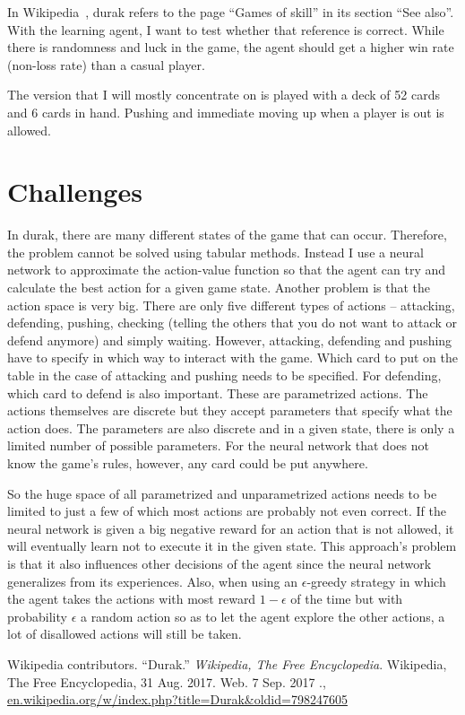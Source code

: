 \documentclass[a4paper,titlepage]{article}
\begin{document}
In Wikipedia~\cite{wikidurak}, durak refers to the page ``Games of skill'' in its section ``See also''. With the learning agent, I want to test whether that reference is correct. While there is randomness and luck in the game, the agent should get a higher win rate (non-loss rate) than a casual player. \medskip

The version that I will mostly concentrate on is played with a deck of 52 cards and 6 cards in hand. Pushing and immediate moving up when a player is out is allowed.

\section{Challenges}

In durak, there are many different states of the game that can occur. Therefore, the problem cannot be solved using tabular methods. Instead I use a neural network to approximate the action-value function so that the agent can try and calculate the best action for a given game state. Another problem is that the action space is very big. There are only five different types of actions -- attacking, defending, pushing, checking (telling the others that you do not want to attack or defend anymore) and simply waiting. However, attacking, defending and pushing have to specify in which way to interact with the game. Which card to put on the table in the case of attacking and pushing needs to be specified. For defending, which card to defend is also important. These are parametrized actions. The actions themselves are discrete but they accept parameters that specify what the action does. The parameters are also discrete and in a given state, there is only a limited number of possible parameters. For the neural network that does not know the game's rules, however, any card could be put anywhere.

So the huge space of all parametrized and unparametrized actions needs to be limited to just a few of which most actions are probably not even correct. If the neural network is given a big negative reward for an action that is not allowed, it will eventually learn not to execute it in the given state. This approach's problem is that it also influences other decisions of the agent since the neural network generalizes from its experiences. Also, when using an $\epsilon$-greedy strategy in which the agent takes the actions with most reward $1 - \epsilon$ of the time but with probability $\epsilon$ a random action so as to let the agent explore the other actions, a lot of disallowed actions will still be taken.

\newpage

\begin{thebibliography}{9}

  Wikipedia contributors. ``Durak.'' \emph{Wikipedia, The Free Encyclopedia}. Wikipedia, The Free Encyclopedia, 31 Aug. 2017. Web.
7 Sep. 2017
., \\
\url{en.wikipedia.org/w/index.php?title=Durak&oldid=798247605}

\end{thebibliography}
\end{document}

